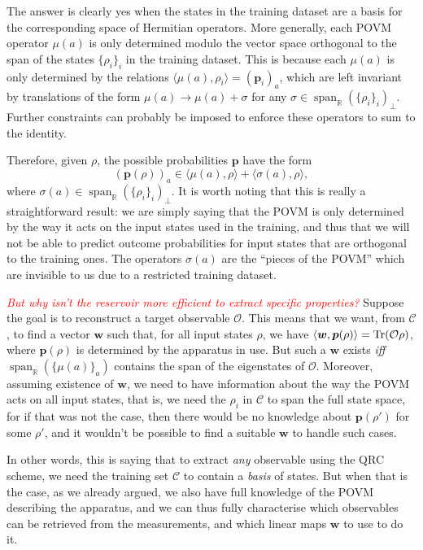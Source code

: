 \documentclass[12pt]{report}
\newcommand{\RR}{\mathbb{R}}
\newcommand{\on}[1]{\operatorname{#1}}
\newcommand{\bs}[1]{\boldsymbol{#1}}
\newcommand{\calC}{{\mathcal{C}}}
\newcommand{\calO}{{\mathcal{O}}}
\begin{document}
The answer is clearly yes when the states in the training dataset are a basis for the corresponding space of Hermitian operators.
More generally, each POVM operator $\mu(a)$ is only determined modulo the vector space orthogonal to the span of the states $\{\rho_i\}_i$ in the training dataset. This is because each $\mu(a)$ is only determined by the relations
	$\langle \mu(a), \rho_i \rangle = (\bs p_i)_a$,
which are left invariant by translations of the form
$\mu(a)\to \mu(a) + \sigma$ for any $\sigma\in\on{span}_\RR(\{\rho_i\}_i)_\perp$.
Further constraints can probably be imposed to enforce these operators to sum to the identity.

Therefore, given $\rho$, the possible probabilities $\bs p$ have the form
\begin{equation}
	(\bs p(\rho))_a \in \langle \mu(a), \rho\rangle + \langle \sigma(a),\rho\rangle,
\end{equation}
where $\sigma(a)\in\on{span}_\RR(\{\rho_i\}_i)_\perp$.
It is worth noting that this is really a straightforward result: we are simply saying that the POVM is only determined by the way it acts on the input states used in the training, and thus that we will not be able to predict outcome probabilities for input states that are orthogonal to the training ones.
The operators $\sigma(a)$ are the ``pieces of the POVM'' which are invisible to us due to a restricted training dataset.

\textcolor{red}{\emph{But why isn't the reservoir more efficient to extract specific properties?}}
Suppose the goal is to reconstruct a target observable $\calO$.
This means that we want, from $\calC$, to find a vector $\bs w$ such that, for all input states $\rho$, we have
$\langle \bs w, \bs p(\rho)\rangle = \Tr(\calO\rho)$,
where $\bs p(\rho)$ is determined by the apparatus in use.
But such a $\bs w$ exists \emph{iff} $\on{span}_\RR(\{\mu(a)\}_a)$ contains the span of the eigenstates of $\calO$.
Moreover, assuming existence of $\bs w$, we need to have information about the way the POVM acts on all input states, that is, we need the $\rho_i$ in $\calC$ to span the full state space, for if that was not the case, then there would be no knowledge about $\bs p(\rho')$ for some $\rho'$, and it wouldn't be possible to find a suitable $\bs w$ to handle such cases.

In other words, this is saying that to extract \emph{any} observable using the QRC scheme, we need the training set $\calC$ to contain a \emph{basis} of states. But when that is the case, as we already argued, we also have full knowledge of the POVM describing the apparatus, and we can thus fully characterise which observables can be retrieved from the measurements, and which linear maps $\bs w$ to use to do it.
\end{document}
